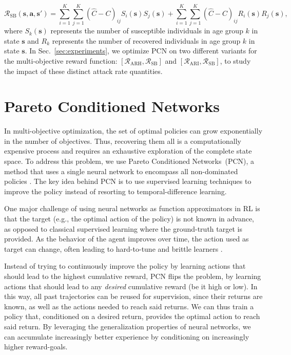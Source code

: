 \documentclass{article}
\renewcommand{\cite}[1]{\citep{#1}}
\newcommand{\mdprewardfn}{\mathcal{R}}
\newcommand{\mdpstate}{\mathbf{s}}
\newcommand{\mdpaction}{\mathbf{a}}
\newcommand{\agegroups}{K}
\begin{document}
\begin{equation}
    \mdprewardfn_{\text{SB}}(\mdpstate,\mdpaction,\mdpstate') = \sum_{i=1}^{\agegroups}\sum_{j=1}^{\agegroups}(\hat{C}-C)_{ij}S_i(\mdpstate)S_j(\mdpstate) + \sum_{i=1}^{\agegroups}\sum_{j=1}^{\agegroups}(\hat{C}-C)_{ij}R_i(\mdpstate)R_j(\mdpstate),
\end{equation}
where $S_k(\mdpstate)$ represents the number of susceptible individuals in age group $k$ in state $\mdpstate$ and $R_k$ represents the number of recovered individuals in age group $k$ in state $\mdpstate$. In Sec.~\ref{sec:experiments}, we optimize PCN on two different variants for the multi-objective reward function: $[\mdprewardfn_\text{ARH}, \mdprewardfn_\text{SB}]$ and $[\mdprewardfn_\text{ARI}, \mdprewardfn_\text{SB}]$, to study the impact of these distinct attack rate quantities.


\section{Pareto Conditioned Networks}
In multi-objective optimization, the set of optimal policies can grow exponentially in the number of objectives. Thus, recovering them all is a computationally expensive process and requires an exhaustive exploration of the complete state space. To address this problem, we use Pareto Conditioned Networks~(PCN), a method that uses a single neural network to encompass all non-dominated policies \cite{reymond2022pcn}. The key idea behind PCN is to use supervised learning techniques to improve the policy instead of resorting to temporal-difference learning. %

One major challenge of using neural networks as function approximators in RL is that the target (e.g., the optimal action of the policy) is not known in advance, as opposed to classical supervised learning where the ground-truth target is provided. As the behavior of the agent improves over time, the action used as target can change, often leading to hard-to-tune and brittle learners \cite{mnih2015,fu2019}.

Instead of trying to continuously improve the policy by learning actions that should lead to the highest cumulative reward, PCN flips the problem, by learning actions that should lead to any \emph{desired} cumulative reward (be it high or low). In this way, all past trajectories can be reused for supervision, since their returns are known, as well as the actions needed to reach said returns. We can thus train a policy that, conditioned on a desired return, provides the optimal action to reach said return. By leveraging the generalization properties of neural networks, we can accumulate increasingly better experience by conditioning on increasingly higher reward-goals.
\end{document}
